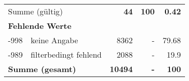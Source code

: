 \begin{longtable}{lXrrr}
     \midrule
     \multicolumn{2}{l}{Summe (gültig)} &
       \textbf{\num{44}} &
     \textbf{\num{100}} &
       \textbf{\num[round-mode=places,round-precision=2]{0.42}} \\
     \multicolumn{5}{l}{\textbf{Fehlende Werte}}\\
       -998 &
       keine Angabe &
         \num{8362} &
        - &
         \num[round-mode=places,round-precision=2]{79.68} \\
       -989 &
       filterbedingt fehlend &
         \num{2088} &
        - &
         \num[round-mode=places,round-precision=2]{19.9} \\
     \midrule
     \multicolumn{2}{l}{\textbf{Summe (gesamt)}} &
          \textbf{\num{10494}} &
        \textbf{-} &
        \textbf{\num{100}} \\
     \bottomrule
     \end{longtable}
     
